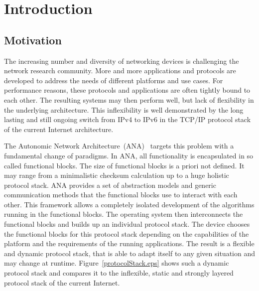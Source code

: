 
\chapter{\label{introduction}Introduction}

\section{Motivation}

The increasing number and diversity of networking devices is challenging the network research community. More and more applications and protocols are developed to address the needs of different platforms and use cases. For performance reasons, these protocols and applications are often tightly bound to each other. The resulting systems may then perform well, but lack of flexibility in the underlying architecture. This inflexibility is well demonstrated by the long lasting and still ongoing switch from IPv4 to IPv6 in the TCP/IP protocol stack of the current Internet architecture.

The Autonomic Network Architecture~(ANA)~\cite{ana} targets this problem with a fundamental change of paradigms. In ANA, all functionality is encapsulated in so called functional blocks. The size of functional blocks is a priori not defined. It may range from a minimalistic checksum calculation up to a huge holistic protocol stack. ANA provides a set of abstraction models and generic communication methods that the functional blocks use to interact with each other. This framework allows a completely isolated development of the algorithms running in the functional blocks. The operating system then interconnects the functional blocks and builds up an individual protocol stack. The device chooses the functional blocks for this protocol stack depending on the capabilities of the platform and the requirements of the running applications. The result is a flexible and dynamic protocol stack, that is able to adapt itself to any given situation and may change at runtime. Figure~\ref{protocolStack.eps} shows such a dynamic protocol stack and compares it to the inflexible, static and strongly layered protocol stack of the current Internet.

